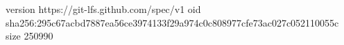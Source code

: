 version https://git-lfs.github.com/spec/v1
oid sha256:295c67acbd7887ea56ce3974133f29a974c0c808977cfe73ac027c052110055c
size 250990
